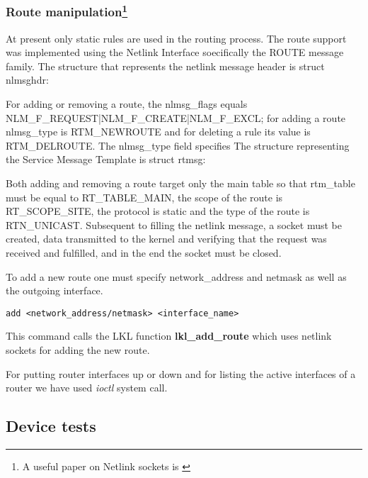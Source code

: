 {{\subsubsection[Route manipulation]{Route manipulation\footnote{A useful paper on Netlink sockets is \cite{netlinksockets}}}
At present only static rules are used in the routing process.
The route support was implemented using the Netlink Interface soecifically the ROUTE message family.
The structure that represents the netlink message header is struct nlmsghdr:
\lstset{language=C, caption=Netlink Message Header Structure}

For adding or removing a route, the nlmsg_flags equals NLM_F_REQUEST|NLM_F_CREATE|NLM_F_EXCL; for adding a route nlmsg_type is RTM_NEWROUTE and for deleting a rule its value is RTM_DELROUTE.
The nlmsg_type field specifies 
The structure representing the Service Message Template is struct rtmsg:
\lstset{language=C, caption=Service Message Template Structure}

Both adding and removing a route target only the main table so that rtm_table must be equal to RT_TABLE_MAIN, the scope of the route is RT_SCOPE_SITE, the protocol is static and the type of the route is RTN_UNICAST.
Subsequent to filling the netlink message, a socket must be created, data transmitted to the kernel and verifying that the request was received and fulfilled, and in the end the socket must be closed.
\lstset{language=C, caption=Communicating with the kernel}
  

To add a new route one must specify network_address and netmask as well as the outgoing interface.
\lstset{language=zsh,caption=Adding a new interface,label=lst:saddrule}
\begin{lstlisting}
add <network_address/netmask> <interface_name> 
\end{lstlisting}  
This command calls the LKL function {\bf lkl_add_route} which uses netlink sockets for adding the new route.

For putting router interfaces up or down and for listing the active interfaces of a router we have used \textit{ioctl} system call.

\subsection{Device tests}
\label{sub-sec:router-tests}

}}
